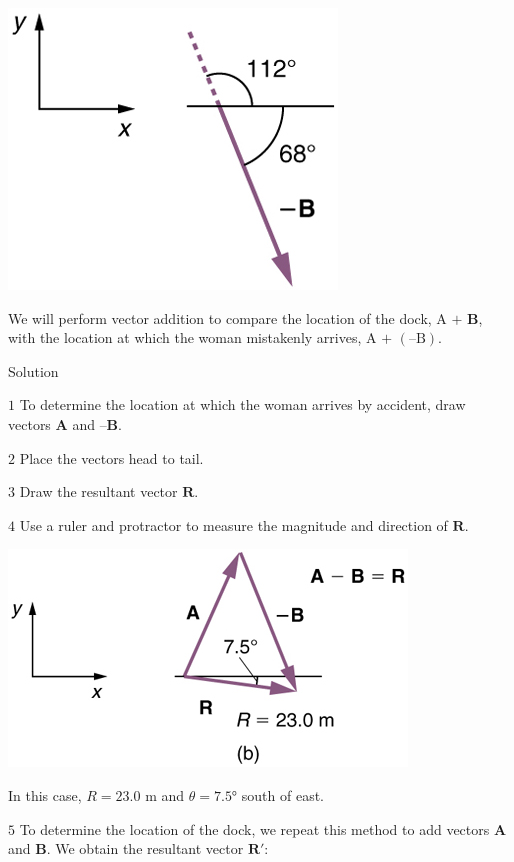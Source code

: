 \documentclass[
]{book}
\begin{document}
\includegraphics{images/Figure_03_02_15a.jpg}

We will perform vector addition to compare the location of the dock,
\({\text{A~}\text{+~}\mathbf{B}}{}\), with the location at which the woman
mistakenly arrives, \({\text{A~+~}(\text{–B})}{}\).

{Solution}

\(1\) To determine the location at which the woman arrives by accident,
draw vectors \(\textbf{A}{}\) and \(\textbf{–B}{}\).

\(2\) Place the vectors head to tail.

\(3\) Draw the resultant vector \(\mathbf{R}{}\).

\(4\) Use a ruler and protractor to measure the magnitude and direction
of \(\mathbf{R}{}\).

\includegraphics{images/Figure_03_02_16a.jpg}

In this case, \({R = \text{23}\text{.}\text{0\ m}}{}\) and
\({{\theta = 7}\text{.}\text{5°}}{}\) south of east.

\(5\) To determine the location of the dock, we repeat this method to
add vectors \(\textbf{A}{}\) and \(\textbf{B}{}\). We obtain the resultant
vector \({\textbf{R}'}{}\):
\end{document}
